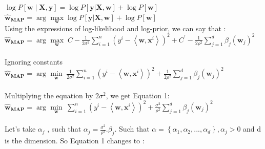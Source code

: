 \documentclass[a4paper,11pt]{article}
\begin{document}
\begin{mlsolution}
\begin{math}
\log P[\textbf{w}\mid\textbf{X},\textbf{y}]  = \log P[\textbf{y}|\textbf{X}, \textbf{w}] + \log P[\textbf{w}]
\end{math}\\

\begin{math}
\widehat{\textbf{w}}_{\textbf{MAP}}  = \arg \underset{\textbf{w}}{\max} \log P[\textbf{y}|\textbf{X}, \textbf{w}] + \log P[\textbf{w}]
\end{math}\\
Using the expressions of log-likelihood and log-prior, we can say that :\\

\begin{math}
\widehat{\textbf{w}}_{\textbf{MAP}}  = \arg \underset{\textbf{w}}{\max} \;
C - \frac{1}{2\sigma^{2}} \sum_{i = 1}^{n} \left ( y^{i} - \left \langle \textbf{w}, \textbf{x}^{i} \right \rangle \right )^{2} + C^{'} - \frac{1}{2\rho^{2}} \sum_{j = 1}^{d} \beta_{j}\left ( \textbf{w}_{j} \right )^{2}
\end{math}\\\\
Ignoring constants \\

\begin{math}
\widehat{\textbf{w}}_{\textbf{MAP}}  = \arg \underset{\textbf{w}}{\min} \;
\frac{1}{2\sigma^{2}} \sum_{i = 1}^{n} \left ( y^{i} - \left \langle \textbf{w}, \textbf{x}^{i} \right \rangle \right )^{2} + \frac{1}{2\rho^{2}} \sum_{j = 1}^{d} \beta_{j}\left ( \textbf{w}_{j} \right )^{2}
\end{math}\\\\
Multiplying the equation by \begin{math}2\sigma^{2}\end{math}, we get Equation 1:\\

\begin{math}
\widehat{\textbf{w}}_{\textbf{MAP}}  = \arg \underset{\textbf{w}}{\min} \; \sum_{i = 1}^{n} \left ( y^{i} - \left \langle \textbf{w}, \textbf{x}^{i} \right \rangle \right )^{2} + \frac{\sigma^{2}}{\rho^{2}} \sum_{j = 1}^{d} \beta_{j}\left ( \textbf{w}_{j} \right )^{2}
\end{math}\\\\
Let's take \begin{math}\alpha_{j}\end{math} , such that \begin{math} \alpha_{j} = \frac{\sigma^{2}}{\rho^{2}}.\beta_{j}  \end{math}.
Such that \begin{math} \alpha = \left \{ \alpha_{1}, \alpha_{2}, ..., \alpha_{d} \right \} , \alpha_{j} > 0\end{math}  and d is the dimension.
So Equation 1 changes to :\\


\end{mlsolution}
\end{document}
